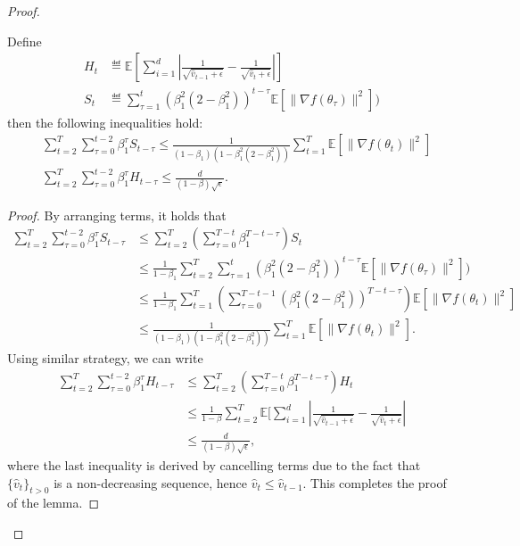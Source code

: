 \documentclass[11pt]{article}
\begin{document}
\begin{proof}
\begin{Lemma} \label{lemma:H,S}
Define
\begin{align*}
H_t &\eqdef \mathbb E[\sum_{i=1}^d |\frac{1}{\sqrt{\hat v_{t-1}+\epsilon}}-\frac{1}{\sqrt{\hat v_t+\epsilon}}| ]\\
S_t & \eqdef \sum_{\tau=1}^t (\beta_1^2(2-\beta_1^2))^{t-\tau}\mathbb E[\|\nabla f(\theta_\tau)\|^2])
\end{align*}
then the following inequalities hold:
\begin{align*}
    &\sum_{t=2}^T\sum_{\tau=0}^{t-2}\beta_1^\tau S_{t-\tau}\leq \frac{1}{(1-\beta_1)(1-\beta_1^2(2-\beta_1^2))}\sum_{t=1}^T \mathbb E[\|\nabla f(\theta_t)\|^2]\\
    &\sum_{t=2}^T \sum_{\tau=0}^{t-2} \beta_1^\tau H_{t-\tau}\leq \frac{d}{(1-\beta)\sqrt\epsilon}.
\end{align*}
\end{Lemma}

\begin{proof}
By arranging terms, it holds that
\begin{align*}
    \sum_{t=2}^T\sum_{\tau=0}^{t-2}\beta_1^\tau S_{t-\tau}&\leq \sum_{t=2}^T (\sum_{\tau=0}^{T-t} \beta_1^{T-t-\tau})S_t\\
    &\leq \frac{1}{1-\beta_1} \sum_{t=2}^T \sum_{\tau=1}^t (\beta_1^2(2-\beta_1^2))^{t-\tau}\mathbb E[\|\nabla f(\theta_\tau)\|^2])\\
    &\leq \frac{1}{1-\beta_1} \sum_{t=1}^T(\sum_{\tau=0}^{T-t-1}(\beta_1^2(2-\beta_1^2))^{T-t-\tau})\mathbb E[\|\nabla f(\theta_t)\|^2]\\
    &\leq \frac{1}{(1-\beta_1)(1-\beta_1^2(2-\beta_1^2))}\sum_{t=1}^T \mathbb E[\|\nabla f(\theta_t)\|^2].
\end{align*}
Using similar strategy, we can write
\begin{align*}
    \sum_{t=2}^T \sum_{\tau=0}^{t-2} \beta_1^\tau H_{t-\tau}&\leq \sum_{t=2}^T (\sum_{\tau=0}^{T-t} \beta_1^{T-t-\tau})H_t\\
    &\leq \frac{1}{1-\beta}\sum_{t=2}^T \mathbb E[\sum_{i=1}^d |\frac{1}{\sqrt{\hat v_{t-1}+\epsilon}}-\frac{1}{\sqrt{\hat v_t+\epsilon}}|\\
    &\leq \frac{d}{(1-\beta)\sqrt\epsilon},
\end{align*}
where the last inequality is derived by cancelling terms due to the fact that $\{\hat v_{t}\}_{t>0}$ is a non-decreasing sequence, hence $\hat v_{t}\leq \hat v_{t-1}$. This completes the proof of the lemma.
\end{proof}


\end{proof}
\end{document}
